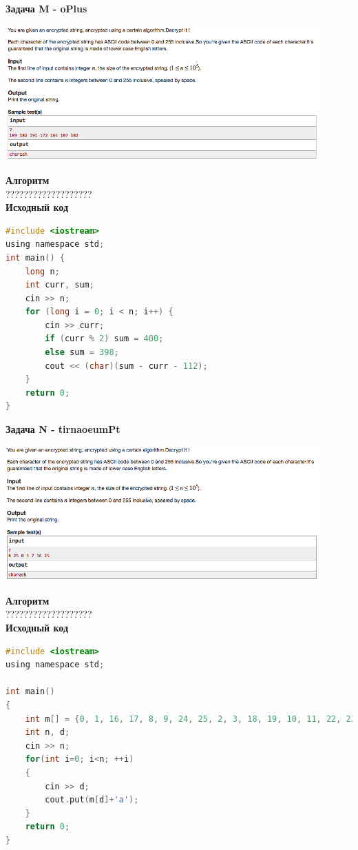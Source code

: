 \documentclass[a4paper,12pt]{article}
\begin{document}
\newpage
\textbf{{\large Задача M - oPlus}} \\
\begin{center}
\includegraphics[width=0.9\textwidth]{CT_Crypto/CT_Crypto_M.png}\\ [1cm]
\end{center}
\textbf{{\large Алгоритм}} \\
{\Huge ???????????????????} \\ 

\textbf{{\large Исходный код}}
\begin{lstlisting}[language=C]
#include <iostream>
using namespace std;
int main() {
	long n;
	int curr, sum;
	cin >> n;
	for (long i = 0; i < n; i++) {
		cin >> curr;
		if (curr % 2) sum = 400;
		else sum = 398;
		cout << (char)(sum - curr - 112);
	}
	return 0;
}
\end{lstlisting}

\newpage
\textbf{{\large Задача N - tirnaoeumPt}} \\
\begin{center}
\includegraphics[width=0.9\textwidth]{CT_Crypto/CT_Crypto_N.png}\\ [1cm]
\end{center}
\textbf{{\large Алгоритм}} \\
{\Huge ???????????????????} \\ 

\textbf{{\large Исходный код}}
\begin{lstlisting}[language=C]
#include <iostream>
using namespace std;

int main()
{
    int m[] = {0, 1, 16, 17, 8, 9, 24, 25, 2, 3, 18, 19, 10, 11, 22, 23, 4,  5,  20, 21, 12, 13, 22, 23, 6,  7,  22, 23, 14, 15};
    int n, d;
    cin >> n;
    for(int i=0; i<n; ++i)
    {
        cin >> d;
        cout.put(m[d]+'a');
    }
    return 0;
}
\end{lstlisting}
\end{document}
